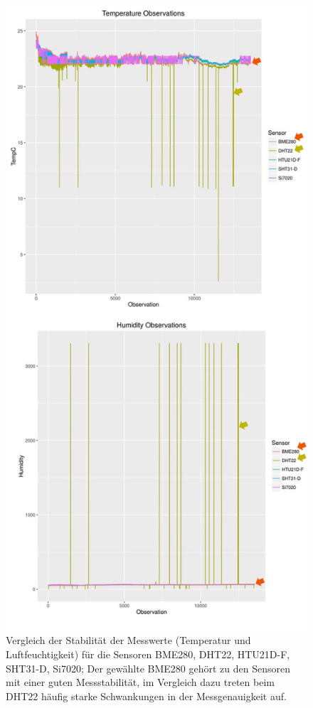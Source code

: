 \documentclass[a4paper,10pt,twocolumn]{article}
\begin{document}
\begin{figure}[htb!]
\centering
\includegraphics[width = (\textwidth)/2]{images/temparaturSensoren_vergleichV.png}
\caption[Vergleich der Stabilität der Messwerte für die Sensoren BME280, DHT22, HTU21D-F, SHT31-D, Si7020]{Vergleich der Stabilität der Messwerte (Temperatur und Luftfeuchtigkeit) für die Sensoren BME280, DHT22, HTU21D-F, SHT31-D, Si7020; Der gewählte BME280 gehört zu den Sensoren mit einer guten Messstabilität, im Vergleich dazu treten beim DHT22 häufig starke Schwankungen in der Messgenauigkeit auf.}
\label{fig:temparatur_sensoren_vergleich}
\end{figure}
\end{document}
